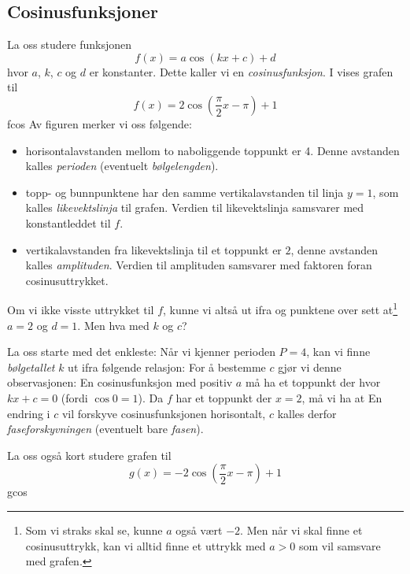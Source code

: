 \subsection{Cosinusfunksjoner}
La oss studere funksjonen
\[ 	f(x) = a\cos (kx+c) + d  \]
hvor $ a $, $ k $, $ c $ og $ d $ er konstanter. Dette kaller vi en \textit{cosinusfunksjon}. I  vises grafen til
\[ f(x)= 2\cos\left(\frac{\pi}{2}x-\pi \right)+1  \]
{fcos} 
Av figuren merker vi oss følgende:
\begin{itemize}
	\item horisontalavstanden mellom to naboliggende toppunkt er 4. Denne avstanden kalles \textit{perioden} (eventuelt \textit{bølgelengden}).	
	\item topp- og bunnpunktene har den samme vertikalavstanden til linja $ {y=1} $, som kalles  \textit{likevektslinja} til grafen. Verdien til likevektslinja samsvarer med konstantleddet til $ f $.
	\item vertikalavstanden fra likevektslinja til et toppunkt er $ 2 $, denne avstanden kalles \textit{amplituden}. Verdien til amplituden samsvarer med faktoren foran cosinusuttrykket.
\end{itemize}
Om vi ikke visste uttrykket til $ f $, kunne vi altså ut ifra   og punktene over sett at\footnote{Som vi straks skal se, kunne $ a $ også vært $ -2 $. Men når vi skal finne et cosinusuttrykk, kan vi alltid finne et uttrykk med ${ a>0} $ som vil samsvare med grafen.} $ {a=2} $ og $ {d=1} $. Men hva med $ k $ og $ c $? \vsk

La oss starte med det enkleste: Når vi kjenner perioden $ {P=4 }$, kan vi finne \textit{bølgetallet} $ k $ ut ifra følgende relasjon:
For å bestemme $ c $ gjør vi denne observasjonen: En cosinusfunksjon med positiv $ a $ må ha et toppunkt der hvor $ {kx+c=0} $ (fordi $ \cos 0=1 $). Da $ f $ har et toppunkt der $ {x=2} $, må vi ha at
En endring i $ c $ vil forskyve cosinusfunksjonen horisontalt, $ c $ kalles derfor \textit{faseforskyvningen} (eventuelt bare \textit{fasen}).\vsk

La oss også kort studere grafen til
\[ {g(x) = -2\cos\left(\frac{\pi}{2}x-\pi\right)+1} \]
{gcos}

